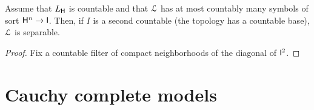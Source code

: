 \documentclass[10pt,oneside]{amsproc}
\newcommand{\mylabel}[1]{{#1}\hfill}
\renewenvironment{itemize}
  {\begin{list}{$\triangleright$}{%
  \setlength{\parskip}{0mm}
  \setlength{\topsep}{.4\baselineskip}
  \setlength{\rightmargin}{0mm}
  \setlength{\listparindent}{0mm}
  \setlength{\itemindent}{0mm}
  \setlength{\labelwidth}{3ex}
  \setlength{\itemsep}{.2\baselineskip}
  \setlength{\parsep}{.2\baselineskip}
  \setlength{\partopsep}{0mm}
  \setlength{\labelsep}{1ex}
  \setlength{\leftmargin}{\labelwidth+\labelsep}
  \let\makelabel\mylabel}}{%
\end{list}}
\renewcommand*{\emph}[1]{%
   \smash{\tikz[baseline]\node[rectangle, fill=teal!25, rounded corners, inner xsep=0.5ex, inner ysep=0.2ex, anchor=base, minimum height = 2.7ex]{\strut #1};}}
\begin{document}
\begin{proposition}
  Assume that $L_{\sf H}$ is countable and that ${\EuScript L}$ has at most countably many symbols of sort ${\sf H}^n\to {\sf I}$.
  Then, if $I$ is a second countable (the topology has a countable base), ${\EuScript L}$ is separable.
\end{proposition}
\begin{proof}
  Fix a countable filter of compact neighborhoods of the diagonal of ${\sf I}^2$.  
\end{proof}












\section{Cauchy complete models}\label{Cauchy}
\end{document}

